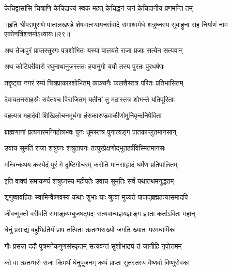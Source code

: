 \twolineshloka
{केचिद्वासांसि चित्राणि केचिद्राज्यं स्वकं महत्}
{केचिद्धनं जनं केचिदानीय प्रणमन्ति तम्}%

{॥इति श्रीपद्मपुराणे पातालखण्डे शेषवात्स्यायनसंवादे रामाश्वमेधे शत्रुघ्नस्य सुबाहुना सह निर्याणं नाम एकोनत्रिंशत्तमोऽध्यायः॥२९॥}



\twolineshloka
{अथ तेजःपुरं प्राप्तस्तुरगः पत्रशोभितः}
{यस्यां पालयते राजा प्रजाः सत्येन सत्यवान्}%

\twolineshloka
{अथ कोटिपरीवारो रघुनाथानुजस्ततः}
{हयानुगो ययौ तस्य पुरतः पुरधर्षणः}%

\twolineshloka
{तद्दृष्ट्वा नगरं रम्यं चित्रप्राकारशोभितम्}
{काञ्चनैः कलशैस्तत्र परितः प्रतिभासितम्}%

\twolineshloka
{देवायतनसाहस्रैः सर्वतश्च विराजितम्}
{यतीनां तु मठास्तत्र शोभन्ते यतिपूरिताः}%

\twolineshloka
{वहत्यत्र महादेवी शिखिलोचनमूर्धगा}
{हंसकारण्डवाकीर्णामुनिवृन्दनिषेविता}%

\twolineshloka
{ब्राह्मणानां प्रत्यगारमग्निहोत्रभवः पुनः}
{धूमस्तत्र पुनात्यङ्ग पातकाप्लुतमानसान्}%

\twolineshloka
{उवाच सुमतिं राजा शत्रुघ्नः शत्रुतापनः}
{तत्पुरप्रेक्षणोद्भूतहर्षविस्मितमानसः}%


\twolineshloka
{मन्त्रिन्कथय कस्येदं पुरं मे दृष्टिगोचरम्}
{करोति मानसाह्लादं धर्मेण प्रतिपालितम्}%


\twolineshloka
{इति वाक्यं समाकर्ण्य शत्रुघ्नस्य महीपतेः}
{उवाच सुमतिः सर्वं यथातथमनुद्धतम्}%


\twolineshloka
{शृणुष्वावहितः स्वामिन्वैष्णवस्य कथाः शुभाः}
{याः श्रुत्वा मुच्यते पापाद्ब्रह्महत्यासमादपि}%

\twolineshloka
{जीवन्मुक्तो वरीवर्ति रामाङ्घ्र्यम्बुजषट्पदः}
{सत्यवान्यज्ञयज्ञाङ्ग ज्ञाता कर्ताऽविता महान्}%

\twolineshloka
{धेनुं प्रसाद्य बहुभिर्व्रतैर्यं प्राप तत्पिता}
{ऋतम्भराख्यो जगति ख्यातः परमधार्मिकः}%

\twolineshloka
{गौः प्रसन्ना ददौ पुत्रमनेकगुणसंस्कृतम्}
{सत्यवन्तं सुशोभाढ्यं तं जानीहि नृपोत्तमम्}%


\twolineshloka
{को वा ऋतम्भरो राजा किमर्थं धेनुपूजनम्}
{कथं प्राप्तः सुतस्तस्य वैष्णवो विष्णुसेवकः}%

